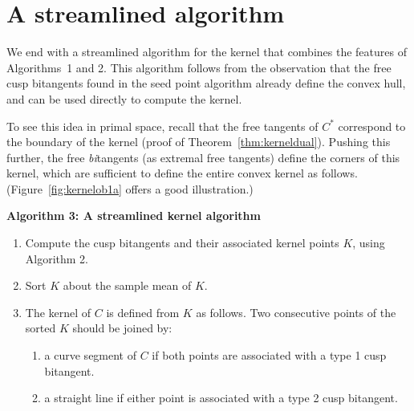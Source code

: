 \documentclass{sig-alternate}
\begin{document}

\section{A streamlined algorithm}
\label{sec:second}

We end with a streamlined algorithm for the kernel 
that combines the features of Algorithms~1 and 2.
This algorithm follows from the observation that the 
free cusp bitangents found in the seed point algorithm
already define the convex hull, and can be used directly
to compute the kernel.

To see this idea in primal space,
recall that the free tangents of $C^*$ correspond to the boundary of the kernel 
(proof of Theorem~\ref{thm:kerneldual}).
Pushing this further, the free {\em bi}tangents (as extremal free tangents) 
define the corners of this kernel, which are sufficient to define the entire convex kernel as follows.
(Figure~\ref{fig:kernelob1a} offers a good illustration.)


\vspace{.2in}

\centerline{{\bf Algorithm 3: A streamlined kernel algorithm}}
\nopagebreak
\begin{enumerate}
\item Compute the cusp bitangents and their associated kernel points $K$, using
	Algorithm 2.
\item Sort $K$ about the sample mean of $K$.
\item The kernel of $C$ is defined from $K$ as follows.
      Two consecutive points of the sorted $K$ should be joined by:
\begin{enumerate}
\item a curve segment of $C$ if both points are associated with a type 1
	cusp bitangent.
\item a straight line if either point is associated with a type 2 cusp bitangent.
\end{enumerate}
\end{enumerate}
\end{document}
